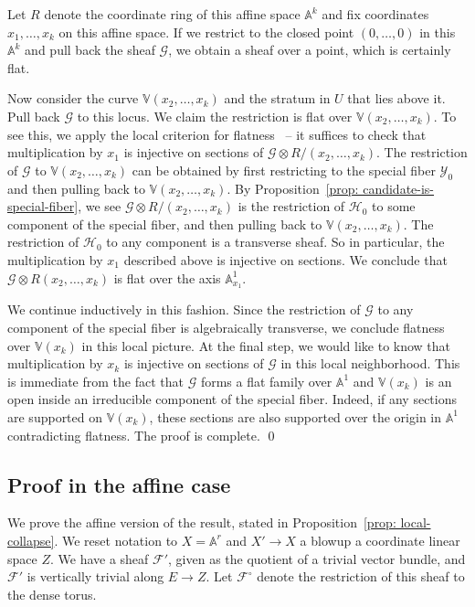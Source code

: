 \documentclass[11pt]{amsart}
\theoremstyle{definition}
\theoremstyle{definition}
\begin{document}
Let $R$ denote the coordinate ring of this affine space $\mathbb A^k$ and fix coordinates $x_1,\ldots,x_k$ on this affine space. If we restrict to the closed point $(0,\ldots,0)$ in this $\mathbb A^k$ and pull back the sheaf $\mathcal G$, we obtain a sheaf over a point, which is certainly flat. 

Now consider the curve $\mathbb V(x_2,\ldots,x_k)$ and the stratum in $U$ that lies above it. Pull back $\mathcal G$ to this locus. We claim the restriction is flat over $\mathbb V(x_2,\ldots,x_k)$. To see this, we apply the local criterion for flatness~\cite[\href{https://stacks.math.columbia.edu/tag/00ML}{Tag 00ML}]{stacks-project} -- it suffices to check that multiplication by $x_1$ is injective on sections of $\mathcal G\otimes R/(x_2,\ldots,x_k)$. The restriction of $\mathcal G$ to $\mathbb V(x_2,\ldots,x_k)$ can be obtained by first restricting to the special fiber $\mathcal Y_0$ and then pulling back to $\mathbb V(x_2,\ldots,x_k)$. By Proposition~\ref{prop: candidate-is-special-fiber}, we see $\mathcal G\otimes R/(x_2,\ldots,x_k)$ is the restriction of $\mathcal H_0$ to some component of the special fiber, and then pulling back to $\mathbb V(x_2,\ldots,x_k)$. The restriction of $\mathcal H_0$ to any component is a transverse sheaf. So in particular, the multiplication by $x_1$ described above is injective on sections. We conclude that $\mathcal G\otimes R(x_2,\ldots,x_k)$ is flat over the axis $\mathbb A^1_{x_1}$. 

We continue inductively in this fashion. Since the restriction of $\mathcal G$ to any component of the special fiber is algebraically transverse, we conclude flatness over $\mathbb V(x_k)$ in this local picture. At the final step, we would like to know that multiplication by $x_k$ is injective on sections of $\mathcal G$ in this local neighborhood. This is immediate from the fact that $\mathcal G$ forms a flat family over $\mathbb A^1$ and $\mathbb V(x_k)$ is an open inside an irreducible component of the special fiber. Indeed, if any sections are supported on $\mathbb V(x_k)$, these sections are also supported over the origin in $\mathbb A^1$ contradicting flatness. The proof is complete. \qed  

\subsection{Proof in the affine case}  We prove the affine version of the result, stated in Proposition~\ref{prop: local-collapse}. We reset notation to $X = \mathbb A^r$ and $X'\to X$ a blowup a coordinate linear space $Z$. We have a sheaf $\mathcal F'$, given as the quotient of a trivial vector bundle, and $\mathcal F'$ is vertically trivial along $E\to Z$. Let $\mathcal F^\circ$ denote the restriction of this sheaf to the dense torus. 
\end{document}
